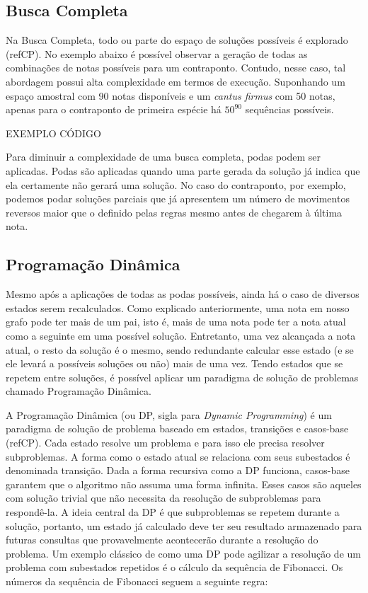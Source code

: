     \subsection[Busca Completa]{Busca Completa}

      Na Busca Completa, todo ou parte do espaço de soluções possíveis é explorado (refCP). No exemplo abaixo é possível observar a geração de todas as combinações de notas possíveis para um contraponto. Contudo, nesse caso, tal abordagem possui alta complexidade em termos de execução. Suponhando um espaço amostral com 90 notas disponíveis e um \textit{cantus firmus} com 50 notas, apenas para o contraponto de primeira espécie há $50^{90}$ sequências possíveis.

      EXEMPLO CÓDIGO

      Para diminuir a complexidade de uma busca completa, podas podem ser aplicadas. Podas são aplicadas quando uma parte gerada da solução já indica que ela certamente não gerará uma solução. No caso do contraponto, por exemplo, podemos podar soluções parciais que já apresentem um número de movimentos reversos maior que o definido pelas regras mesmo antes de chegarem à última nota.

    \subsection[Programação Dinâmica]{Programação Dinâmica}

      Mesmo após a aplicações de todas as podas possíveis, ainda há o caso de diversos estados serem recalculados. Como explicado anteriormente, uma nota em nosso grafo pode ter mais de um pai, isto é, mais de uma nota pode ter a nota atual como a seguinte em uma possível solução. Entretanto, uma vez alcançada a nota atual, o resto da solução é o mesmo, sendo redundante calcular esse estado (e se ele levará a possíveis soluções ou não) mais de uma vez. Tendo estados que se repetem entre soluções, é possível aplicar um paradigma de solução de problemas chamado Programação Dinâmica.

      A Programação Dinâmica (ou DP, sigla para \textit{Dynamic Programming}) é um paradigma de solução de problema baseado em estados, transições e casos-base (refCP). Cada estado resolve um problema e para isso ele precisa resolver subproblemas. A forma como o estado atual se relaciona com seus subestados é denominada transição. Dada a forma recursiva como a DP funciona, casos-base garantem que o algoritmo não assuma uma forma infinita. Esses casos são aqueles com solução trivial que não necessita da resolução de subproblemas para respondê-la. A ideia central da DP é que subproblemas se repetem durante a solução, portanto, um estado já calculado deve ter seu resultado armazenado para futuras consultas que provavelmente acontecerão durante a resolução do problema. Um exemplo clássico de como uma DP pode agilizar a resolução de um problema com subestados repetidos é o cálculo da sequência de Fibonacci. Os números da sequência de Fibonacci seguem a seguinte regra:

